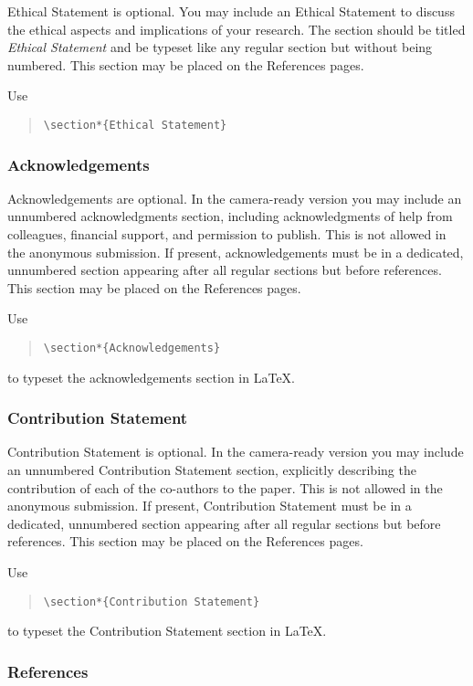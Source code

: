 \documentclass{article}
\begin{document}
Ethical Statement is optional. You may include an Ethical Statement to discuss  the ethical aspects and implications of your research. The section should be titled \emph{Ethical Statement} and be typeset like any regular section but without being numbered. This section may be placed on the References pages.

Use
\begin{quote}
    {\tt \textbackslash{}section*\{Ethical Statement\}}
\end{quote}

\subsubsection{Acknowledgements}

Acknowledgements are optional. In the camera-ready version you may include an unnumbered acknowledgments section, including acknowledgments of help from colleagues, financial support, and permission to publish. This is not allowed in the anonymous submission. If present, acknowledgements must be in a dedicated, unnumbered section appearing after all regular sections but before references.  This section may be placed on the References pages.

Use
\begin{quote}
    {\tt \textbackslash{}section*\{Acknowledgements\}}
\end{quote}
to typeset the acknowledgements section in \LaTeX{}.


\subsubsection{Contribution Statement}

Contribution Statement is optional. In the camera-ready version you may include an unnumbered Contribution Statement section, explicitly describing the contribution of each of the co-authors to the paper. This is not allowed in the anonymous submission. If present, Contribution Statement must be in a dedicated, unnumbered section appearing after all regular sections but before references.  This section may be placed on the References pages.

Use
\begin{quote}
    {\tt \textbackslash{}section*\{Contribution Statement\}}
\end{quote}
to typeset the Contribution Statement section in \LaTeX{}.

\subsubsection{References}
\end{document}
